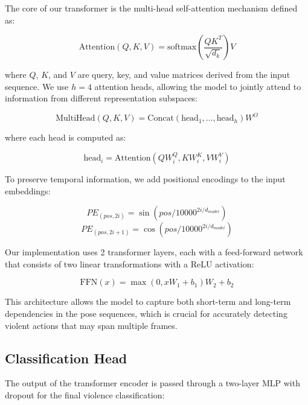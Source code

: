 \documentclass[conference]{IEEEtran}
\begin{document}
The core of our transformer is the multi-head self-attention mechanism defined as:

\begin{equation}
\text{Attention}(Q, K, V) = \text{softmax}\left(\frac{QK^T}{\sqrt{d_k}}\right)V
\end{equation}

where $Q$, $K$, and $V$ are query, key, and value matrices derived from the input sequence. We use $h=4$ attention heads, allowing the model to jointly attend to information from different representation subspaces:

\begin{equation}
\text{MultiHead}(Q, K, V) = \text{Concat}(\text{head}_1, \ldots, \text{head}_h)W^O
\end{equation}

where each head is computed as:

\begin{equation}
\text{head}_i = \text{Attention}(QW_i^Q, KW_i^K, VW_i^V)
\end{equation}

To preserve temporal information, we add positional encodings to the input embeddings:

\begin{equation}
PE_{(pos, 2i)} = \sin(pos/10000^{2i/d_{model}})
\end{equation}
\begin{equation}
PE_{(pos, 2i+1)} = \cos(pos/10000^{2i/d_{model}})
\end{equation}

Our implementation uses 2 transformer layers, each with a feed-forward network that consists of two linear transformations with a ReLU activation:

\begin{equation}
\text{FFN}(x) = \max(0, xW_1 + b_1)W_2 + b_2
\end{equation}

This architecture allows the model to capture both short-term and long-term dependencies in the pose sequences, which is crucial for accurately detecting violent actions that may span multiple frames.

\subsection{Classification Head}
The output of the transformer encoder is passed through a two-layer MLP with dropout for the final violence classification:
\end{document}
